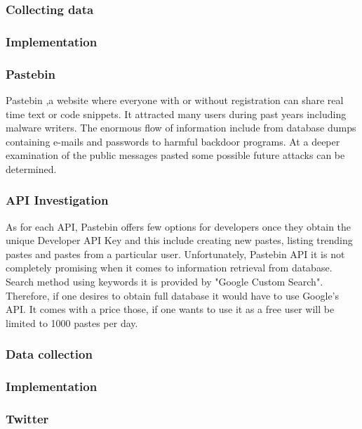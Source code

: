 \documentclass[12pt]{article}
\begin{document}
\subsubsection{Collecting data}
\subsubsection{Implementation}
\subsubsection*{Pastebin}

Pastebin \cite{pastebin},a website where everyone with or without registration can share real time text or code snippets. It attracted many users during past years including malware writers. The enormous flow of information include from database dumps containing e-mails and passwords to harmful backdoor programs. At a deeper examination of the public messages pasted some possible future attacks can be determined.

\subsubsection{API Investigation}

As for each API, Pastebin offers few options for developers once they obtain the unique Developer API Key and this include creating new pastes, listing trending pastes and pastes from a particular user. 
Unfortunately, Pastebin API it is not completely promising when it comes to  information retrieval from database. Search method using keywords it is provided by "Google Custom Search". Therefore, if one desires to obtain full database it would have to use Google's API. It comes with a price those, if one wants to use it as a free user will be limited to 1000 pastes per day. 

\subsubsection{Data collection}

\subsubsection{Implementation}

\subsubsection*{Twitter}
\end{document}
